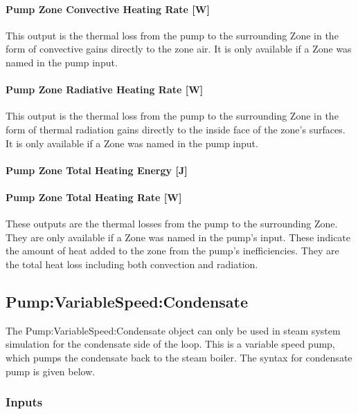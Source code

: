 \paragraph{Pump Zone Convective Heating Rate {[}W{]}}\label{pump-zone-convective-heating-rate-w-1}

This output is the thermal loss from the pump to the surrounding Zone in the form of convective gains directly to the zone air. It is only available if a Zone was named in the pump input.

\paragraph{Pump Zone Radiative Heating Rate {[}W{]}}\label{pump-zone-radiative-heating-rate-w-1}

This output is the thermal loss from the pump to the surrounding Zone in the form of thermal radiation gains directly to the inside face of the zone's surfaces. It is only available if a Zone was named in the pump input.

\paragraph{Pump Zone Total Heating Energy {[}J{]}}\label{pump-zone-total-heating-energy-j-1}

\paragraph{Pump Zone Total Heating Rate {[}W{]}}\label{pump-zone-total-heating-rate-w-1}

These outputs are the thermal losses from the pump to the surrounding Zone. They are only available if a Zone was named in the pump's input. These indicate the amount of heat added to the zone from the pump's inefficiencies. They are the total heat loss including both convection and radiation.

\subsection{Pump:VariableSpeed:Condensate}\label{pumpvariablespeedcondensate}

The Pump:VariableSpeed:Condensate object can only be used in steam system simulation for the condensate side of the loop. This is a variable speed pump, which pumps the condensate back to the steam boiler. The syntax for condensate pump is given below.

\subsubsection{Inputs}\label{inputs-2-031}

